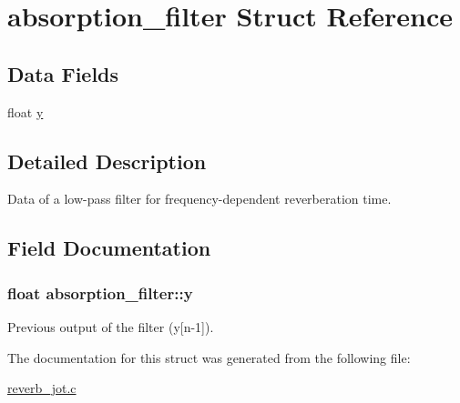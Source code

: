 \hypertarget{structabsorption__filter}{\section{absorption\-\_\-filter Struct Reference}
\label{structabsorption__filter}
}
\subsection*{Data Fields}
\begin{DoxyCompactItemize}
\item 
float \hyperlink{structabsorption__filter_a3e56f97968252e954f08b92e2f5efcde}{y}
\end{DoxyCompactItemize}


\subsection{Detailed Description}
Data of a low-\/pass filter for frequency-\/dependent reverberation time. 

\subsection{Field Documentation}
\hypertarget{structabsorption__filter_a3e56f97968252e954f08b92e2f5efcde}{
\subsubsection[{y}]{\setlength{\rightskip}{0pt plus 5cm}float absorption\-\_\-filter\-::y}}\label{structabsorption__filter_a3e56f97968252e954f08b92e2f5efcde}
Previous output of the filter (y\mbox{[}n-\/1\mbox{]}). 

The documentation for this struct was generated from the following file\-:\begin{DoxyCompactItemize}
\item 
\hyperlink{reverb__jot_8c}{reverb\-\_\-jot.\-c}\end{DoxyCompactItemize}
